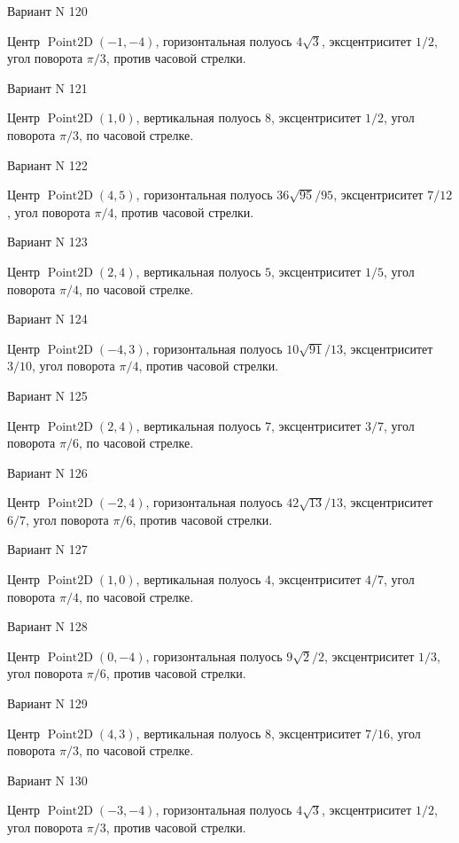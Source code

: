 \documentclass[11pt]{report}
\begin{document}
Вариант N 120

Центр $\operatorname{Point2D}\left(-1, -4\right)$, горизонтальная полуось $4 \sqrt{3}$, эксцентриситет $1 / 2$, угол поворота $\pi / 3$, против часовой стрелки.

Вариант N 121

Центр $\operatorname{Point2D}\left(1, 0\right)$, вертикальная полуось $8$, эксцентриситет $1 / 2$, угол поворота $\pi / 3$, по часовой стрелке.

Вариант N 122

Центр $\operatorname{Point2D}\left(4, 5\right)$, горизонтальная полуось $36 \sqrt{95} / 95$, эксцентриситет $7 / 12$, угол поворота $\pi / 4$, против часовой стрелки.

Вариант N 123

Центр $\operatorname{Point2D}\left(2, 4\right)$, вертикальная полуось $5$, эксцентриситет $1 / 5$, угол поворота $\pi / 4$, по часовой стрелке.

Вариант N 124

Центр $\operatorname{Point2D}\left(-4, 3\right)$, горизонтальная полуось $10 \sqrt{91} / 13$, эксцентриситет $3 / 10$, угол поворота $\pi / 4$, против часовой стрелки.

Вариант N 125

Центр $\operatorname{Point2D}\left(2, 4\right)$, вертикальная полуось $7$, эксцентриситет $3 / 7$, угол поворота $\pi / 6$, по часовой стрелке.

Вариант N 126

Центр $\operatorname{Point2D}\left(-2, 4\right)$, горизонтальная полуось $42 \sqrt{13} / 13$, эксцентриситет $6 / 7$, угол поворота $\pi / 6$, против часовой стрелки.

Вариант N 127

Центр $\operatorname{Point2D}\left(1, 0\right)$, вертикальная полуось $4$, эксцентриситет $4 / 7$, угол поворота $\pi / 4$, по часовой стрелке.

Вариант N 128

Центр $\operatorname{Point2D}\left(0, -4\right)$, горизонтальная полуось $9 \sqrt{2} / 2$, эксцентриситет $1 / 3$, угол поворота $\pi / 6$, против часовой стрелки.

Вариант N 129

Центр $\operatorname{Point2D}\left(4, 3\right)$, вертикальная полуось $8$, эксцентриситет $7 / 16$, угол поворота $\pi / 3$, по часовой стрелке.

Вариант N 130

Центр $\operatorname{Point2D}\left(-3, -4\right)$, горизонтальная полуось $4 \sqrt{3}$, эксцентриситет $1 / 2$, угол поворота $\pi / 3$, против часовой стрелки.
\end{document}
